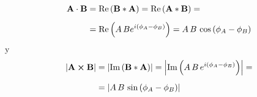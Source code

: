 \documentclass[12pt]{article}
\begin{document}
\begin{align}
\begin{aligned}[b]
    \vb{A} \cdot \vb{B} &= \Re \left( \vb{B} * \vb{A} \right) = \Re \left( \vb{A} * \vb{B} \right) = \\[0.5em]
    &= \Re \left( A \, B e^{i ( \phi_{A} - \phi_{B})} \right) = A \, B \, \cos \left( \phi_{A} - \phi_{B} \right)
\end{aligned}
\label{eq:ecuacion_01_88}
\end{align}
y
\begin{align}
\begin{aligned}[b]
    \abs{ \vb{A} \cp \vb{B}} &= \abs{ \Im \left( \vb{B} * \vb{A} \right) } = \abs{ \Im \left( A \, B \, e^{i (\phi_{A} - \phi_{B})} \right)} = \\[0.5em]
    &= \abs{ A \, B \, \sin \left( \phi_{A} - \phi_{B} \right)}
\end{aligned}
\label{eq:ecuacion_01_89}
\end{align}
\end{document}
